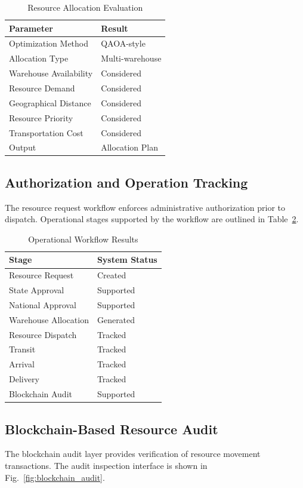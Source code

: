 \documentclass[conference]{IEEEtran}
\begin{document}
\begin{table}[htbp]
\centering
\caption{Resource Allocation Evaluation}
\label{tab:allocation_eval}
\begin{tabular}{ll}
\toprule
\textbf{Parameter} & \textbf{Result} \\
\midrule
Optimization Method & QAOA-style \\
Allocation Type & Multi-warehouse \\
Warehouse Availability & Considered \\
Resource Demand & Considered \\
Geographical Distance & Considered \\
Resource Priority & Considered \\
Transportation Cost & Considered \\
Output & Allocation Plan \\
\bottomrule
\end{tabular}
\end{table}

\subsection{Authorization and Operation Tracking}
The resource request workflow enforces administrative authorization prior to dispatch. Operational stages supported by the workflow are outlined in Table~\ref{tab:workflow_results}.

\begin{table}[htbp]
\centering
\caption{Operational Workflow Results}
\label{tab:workflow_results}
\begin{tabular}{ll}
\toprule
\textbf{Stage} & \textbf{System Status} \\
\midrule
Resource Request & Created \\
State Approval & Supported \\
National Approval & Supported \\
Warehouse Allocation & Generated \\
Resource Dispatch & Tracked \\
Transit & Tracked \\
Arrival & Tracked \\
Delivery & Tracked \\
Blockchain Audit & Supported \\
\bottomrule
\end{tabular}
\end{table}

\subsection{Blockchain-Based Resource Audit}
The blockchain audit layer provides verification of resource movement transactions. The audit inspection interface is shown in Fig.~\ref{fig:blockchain_audit}.
\end{document}
